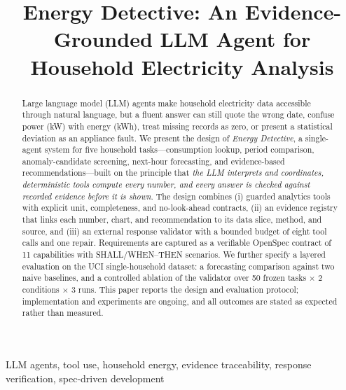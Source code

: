 \documentclass[conference]{IEEEtran}
\begin{document}
\title{Energy Detective: An Evidence-Grounded LLM Agent
for Household Electricity Analysis}

\author{
}

\maketitle

\begin{abstract}
Large language model (LLM) agents make household electricity data
accessible through natural language, but a fluent answer can still quote
the wrong date, confuse power (kW) with energy (kWh), treat missing
records as zero, or present a statistical deviation as an appliance
fault. We present the design of \emph{Energy Detective}, a single-agent
system for five household tasks---consumption lookup, period comparison,
anomaly-candidate screening, next-hour forecasting, and evidence-based
recommendations---built on the principle that \emph{the LLM interprets
and coordinates, deterministic tools compute every number, and every
answer is checked against recorded evidence before it is shown}. The
design combines (i) guarded analytics tools with explicit unit,
completeness, and no-look-ahead contracts, (ii) an evidence registry
that links each number, chart, and recommendation to its data slice,
method, and source, and (iii) an external response validator with a
bounded budget of eight tool calls and one repair. Requirements are
captured as a verifiable OpenSpec contract of 11 capabilities with
SHALL/WHEN--THEN scenarios. We further specify a layered evaluation on
the UCI single-household dataset: a forecasting comparison against two
naive baselines, and a controlled ablation of the validator over 50
frozen tasks $\times$ 2 conditions $\times$ 3 runs. This paper reports
the design and evaluation protocol; implementation and experiments are
ongoing, and all outcomes are stated as expected rather than measured.
\end{abstract}

\begin{IEEEkeywords}
LLM agents, tool use, household energy, evidence traceability,
response verification, spec-driven development
\end{IEEEkeywords}
\end{document}
